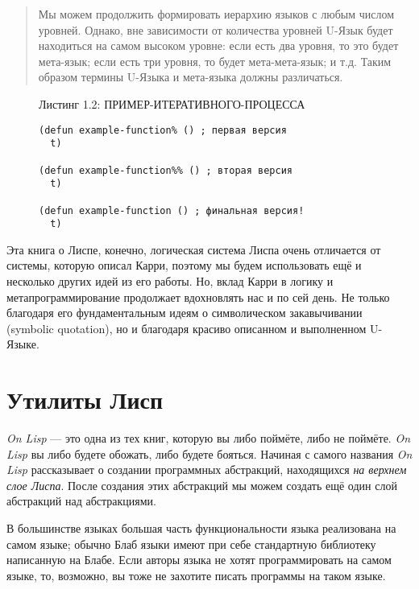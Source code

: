 \begin{quote}
Мы можем продолжить формировать иерархию языков с любым числом уровней. Однако, вне зависимости от количества уровней U-Язык будет находиться на самом высоком уровне: если есть два уровня, то это будет мета-язык; если есть три уровня, то будет мета-мета-язык; и т.д. Таким образом термины U-Языка и мета-языка должны различаться.
\end{quote}



\begin{figure}Листинг 1.2: ПРИМЕР-ИТЕРАТИВНОГО-ПРОЦЕССА\label{listing_1.2}
\listbegin
\begin{verbatim}
(defun example-function% () ; первая версия
  t)

(defun example-function%% () ; вторая версия
  t)

(defun example-function () ; финальная версия!
  t)
\end{verbatim}
\listend
\end{figure}

Эта книга о Лиспе, конечно, логическая система Лиспа очень отличается от системы, которую описал Карри, поэтому мы будем использовать ещё и несколько других идей из его работы. Но, вклад Карри в логику и метапрограммирование продолжает вдохновлять нас и по сей день. Не только благодаря его фундаментальным идеям о символическом закавычивании (symbolic quotation), но и благодаря красиво описанном и выполненном U-Языке.
\section{Утилиты Лисп}\label{section_the_lisp_utility}

\emph{On Lisp} --- это одна из тех книг, которую вы либо поймёте, либо не поймёте. \emph{On Lisp} вы либо будете обожать, либо будете бояться. Начиная с самого названия \emph{On Lisp} рассказывает о создании программных абстракций, находящихся \emph{на верхнем слое Лиспа}. После создания этих абстракций мы можем создать ещё один слой абстракций над абстракциями.

В большинстве языках большая часть функциональности языка реализована на самом языке; обычно Блаб языки имеют при себе стандартную библиотеку написанную на Блабе. Если авторы языка не хотят программировать на самом языке, то, возможно, вы тоже не захотите писать программы на таком языке.

